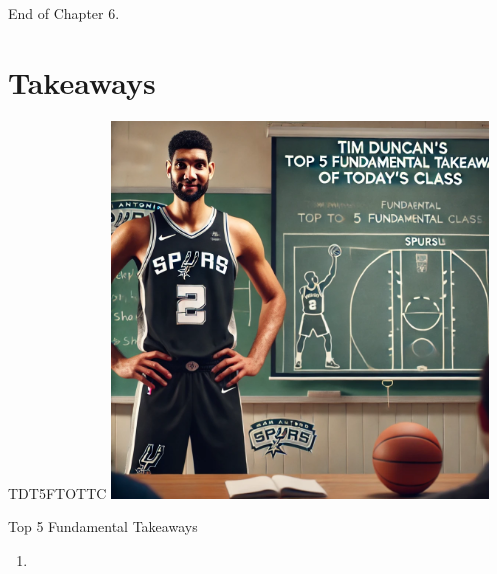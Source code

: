 \documentclass{beamer}
\begin{document}
\begin{frame}{}
\end{frame}


\begin{frame}{}
     \centering
     \Huge End of Chapter 6.
\end{frame}

\section*{Takeaways}

\begin{frame}{TDT5FTOTTC}
    \centering
    \includegraphics[width=0.75\textwidth]{figures/tim.png}
\end{frame}

\begin{frame}{Top 5 Fundamental Takeaways}
    \small
    \begin{enumerate}
        \item[5]
    \end{enumerate}
\end{frame}
\end{document}
